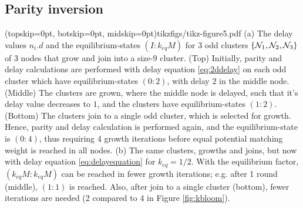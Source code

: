 \subsection{Parity inversion}

\Figure[htb](topskip=0pt, botskip=0pt, midskip=0pt){tikzfigs/tikz-figure5.pdf}{
    (a) The delay values $n_i.d$ and the equilibrium-states $(I:k_{eq}M)$ for 3 odd clusters $\{\mathcal{N}_1, \mathcal{N}_2, \mathcal{N}_3\}$ of 3 nodes that grow and join into a size-9 cluster. (Top) Initially, parity and delay calculations  are performed with delay equation \eqref{eq:2ddelay} on each odd cluster which have equilibrium-states $(0:2)$, with delay $2$ in the middle node. (Middle) The clusters are grown, where the middle node is delayed, such that it's delay value decreases to $1$, and the clusters have equilibrium-states $(1:2)$. (Bottom) The clusters join to a single odd cluster, which is selected for growth. Hence, parity and delay calculation is performed again, and the equilibrium-state is $(0:4)$, thus requiring 4 growth iterations before equal potential matching weight is reached in all nodes.  (b) The same clusters, growths and joins, but now with delay equation \eqref{eq:delayequation} for $k_{eq} = 1/2$. With the equilibrium factor, $(k_{eq}M:k_{eq}M)$ can be reached in fewer growth iterations; e.g. after 1 round (middle), $(1:1)$ is reached. Also, after join to a single cluster (bottom), fewer iterations are needed (2 compared to 4 in Figure \ref{fig:kbloom}).\label{fig5}}